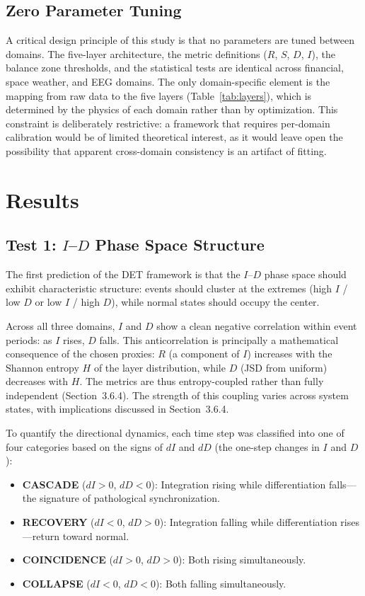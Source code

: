 \documentclass[aip,cha,reprint,amsmath,amssymb,final,floatfix]{revtex4-2}
\begin{document}
\subsection{Zero Parameter Tuning}

A critical design principle of this study is that no parameters are tuned between domains. The five-layer architecture, the metric definitions ($R$, $S$, $D$, $I$), the balance zone thresholds, and the statistical tests are identical across financial, space weather, and EEG domains. The only domain-specific element is the mapping from raw data to the five layers (Table~\ref{tab:layers}), which is determined by the physics of each domain rather than by optimization. This constraint is deliberately restrictive: a framework that requires per-domain calibration would be of limited theoretical interest, as it would leave open the possibility that apparent cross-domain consistency is an artifact of fitting.


\section{Results}

\subsection{Test 1: $I$--$D$ Phase Space Structure}

The first prediction of the DET framework is that the $I$--$D$ phase space should exhibit characteristic structure: events should cluster at the extremes (high $I$ / low $D$ or low $I$ / high $D$), while normal states should occupy the center.

Across all three domains, $I$ and $D$ show a clean negative correlation within event periods: as $I$ rises, $D$ falls. This anticorrelation is principally a mathematical consequence of the chosen proxies: $R$ (a component of $I$) increases with the Shannon entropy $H$ of the layer distribution, while $D$ (JSD from uniform) decreases with $H$. The metrics are thus entropy-coupled rather than fully independent (Section~3.6.4). The strength of this coupling varies across system states, with implications discussed in Section~3.6.4.

To quantify the directional dynamics, each time step was classified into one of four categories based on the signs of $dI$ and $dD$ (the one-step changes in $I$ and $D$):

\begin{itemize}
\item \textbf{CASCADE} ($dI > 0$, $dD < 0$): Integration rising while differentiation falls---the signature of pathological synchronization.
\item \textbf{RECOVERY} ($dI < 0$, $dD > 0$): Integration falling while differentiation rises---return toward normal.
\item \textbf{COINCIDENCE} ($dI > 0$, $dD > 0$): Both rising simultaneously.
\item \textbf{COLLAPSE} ($dI < 0$, $dD < 0$): Both falling simultaneously.
\end{itemize}
\end{document}
